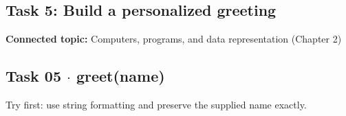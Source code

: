\documentclass[11pt]{article}
\begin{document}
\begin{keepsection}
\section{Task 5: Build a personalized greeting}

\textbf{Connected topic:} Computers, programs, and data representation (Chapter 2)

\begin{keepsection}
\subsection{Task 05 \ensuremath{\cdot} greet(name)}

Try first: use string formatting and preserve the supplied name exactly.

\end{keepsection}
\end{keepsection}


\clearpage
\end{document}
